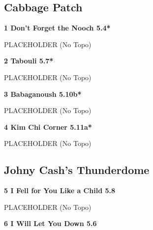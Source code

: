 \begin{multicols}{2}
	
			\subsection*{Cabbage Patch}\label{bf:Cabbage Patch}
						
					\label{rt:Don't Forget the Nooch}
\colorbox{green!20}{
\parbox{0.95\linewidth}{
\textbf{
1 Don't Forget the Nooch 5.4*  
}
}
}

					\begin{adjustwidth}{0.5cm}{}				
					PLACEHOLDER
						\newline (No Topo) 
					\end{adjustwidth}
					\label{rt:Tabouli}
\colorbox{green!20}{
\parbox{0.95\linewidth}{
\textbf{
2 Tabouli 5.7*  
}
}
}

					\begin{adjustwidth}{0.5cm}{}				
					PLACEHOLDER
						\newline (No Topo) 
					\end{adjustwidth}
					\label{rt:Babaganoush}
\colorbox{RoyalBlue!20}{
\parbox{0.95\linewidth}{
\textbf{
3 Babaganoush 5.10b*  
}
}
}

					\begin{adjustwidth}{0.5cm}{}				
					PLACEHOLDER
						\newline (No Topo) 
					\end{adjustwidth}
					\label{rt:Kim Chi Corner}
\colorbox{RoyalBlue!20}{
\parbox{0.95\linewidth}{
\textbf{
4 Kim Chi Corner 5.11a*  
}
}
}

					\begin{adjustwidth}{0.5cm}{}				
					PLACEHOLDER
						\newline (No Topo) 
					\end{adjustwidth}
			\subsection*{Johny Cash's Thunderdome}\label{bf:Johny Cash's Thunderdome}
						
					\label{rt:I Fell for You Like a Child}
\colorbox{green!20}{
\parbox{0.95\linewidth}{
\textbf{
5 I Fell for You Like a Child 5.8  
}
}
}

					\begin{adjustwidth}{0.5cm}{}				
					PLACEHOLDER
						\newline (No Topo) 
					\end{adjustwidth}
					\label{rt:I Will Let You Down}
\colorbox{green!20}{
\parbox{0.95\linewidth}{
\textbf{
6 I Will Let You Down 5.6  
}
}
}


\end{multicols}
